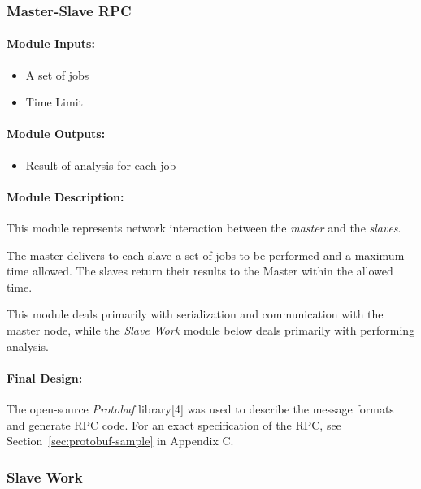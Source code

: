 \documentclass[pdftex,12pt,a4paper]{article}
\begin{document}
\subsubsection{Master-Slave RPC}

\paragraph{Module Inputs:}
\begin{itemize}
\item A set of jobs
\item Time Limit
\end{itemize}

\paragraph{Module Outputs:}
\begin{itemize}
\item Result of analysis for each job
\end{itemize}

\paragraph{Module Description:\\}
This module represents network interaction between the \emph{master} and the \emph{slaves}.

The master delivers to each slave a set of jobs to be performed and a maximum time allowed. The slaves return their results to the Master within the allowed time.

This module deals primarily with serialization and communication with the master node, while the \emph{Slave Work} module below deals primarily with performing analysis.

\paragraph{Final Design:\\}
The open-source \emph{Protobuf} library[4] was used to describe the message formats and generate RPC code. For an exact specification of the RPC, see Section~\ref{sec:protobuf-sample} in Appendix C.


\subsubsection{Slave Work}
\end{document}
